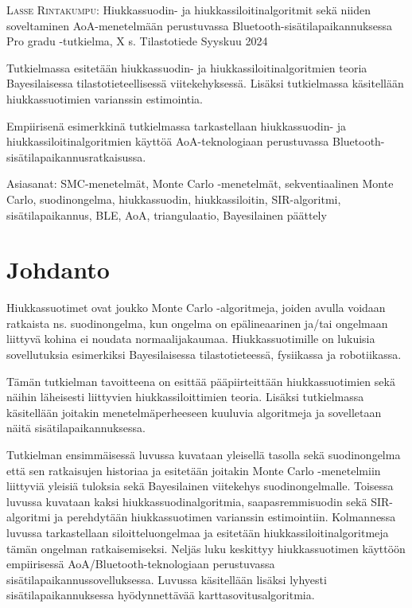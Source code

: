 \documentclass[
  12pt,
  a4paper, twoside]{book}
\newcommand{\tekija}{{Lasse Rintakumpu}}
\newcommand{\otsikko}{{Hiukkassuodin- ja hiukkassiloitinalgoritmit sekä niiden soveltaminen AoA-menetelmään perustuvassa Bluetooth-sisätilapaikannuksessa}}
\newcommand{\tutkielma}{{Pro gradu }}
\newcommand{\aika}{{Syyskuu 2024}}
\newcommand{\paaaine}{{Tilastotiede}}
\begin{document}
\noindent \textsc{\tekija}: \otsikko \newline
\tutkielma-tutkielma, X s. \newline
\paaaine \newline
\aika
\par\noindent{\rule{\textwidth}{.2mm}} \newline


\vspace{4mm}\noindent Tutkielmassa esitetään hiukkassuodin- ja hiukkassiloitinalgoritmien teoria Bayesilaisessa tilastotieteellisessä viitekehyksessä. Lisäksi tutkielmassa käsitellään hiukkassuotimien varianssin estimointia.

\vspace{4mm}\noindent Empiirisenä esimerkkinä tutkielmassa tarkastellaan hiukkassuodin- ja hiukkassiloitinalgoritmien käyttöä AoA-teknologiaan perustuvassa Bluetooth-sisätilapaikannusratkaisussa.

\vspace{4mm}\noindent Asiasanat: SMC-menetelmät, Monte Carlo -menetelmät, sekventiaalinen Monte Carlo, suodinongelma, hiukkassuodin, hiukkassiloitin, SIR-algoritmi, sisätilapaikannus, BLE, AoA, triangulaatio, Bayesilainen päättely

\cleardoublepage

\cleardoublepage

\pagestyle{plain} 

{
\hypersetup{linkcolor=blue}
\setcounter{tocdepth}{2}
\tableofcontents
}
\setlength\parindent{24pt}
\setlength\parskip{3pt}

\chapter{Johdanto}

Hiukkassuotimet ovat joukko Monte Carlo -algoritmeja, joiden avulla voidaan ratkaista ns. suodinongelma, kun ongelma on epälineaarinen ja/tai ongelmaan liittyvä kohina ei noudata normaalijakaumaa. Hiukkassuotimille on lukuisia sovellutuksia esimerkiksi Bayesilaisessa tilastotieteessä, fysiikassa ja robotiikassa.

Tämän tutkielman tavoitteena on esittää pääpiirteittään hiukkassuotimien sekä näihin läheisesti liittyvien hiukkassiloittimien teoria. Lisäksi tutkielmassa käsitellään joitakin menetelmäperheeseen kuuluvia algoritmeja ja sovelletaan näitä sisätilapaikannuksessa.

Tutkielman ensimmäisessä luvussa kuvataan yleisellä tasolla sekä suodinongelma että sen ratkaisujen historiaa ja esitetään joitakin Monte Carlo -menetelmiin liittyviä yleisiä tuloksia sekä Bayesilainen viitekehys suodinongelmalle. Toisessa luvussa kuvataan kaksi hiukkassuodinalgoritmia, saapasremmisuodin sekä SIR-algoritmi ja perehdytään hiukkassuotimen varianssin estimointiin. Kolmannessa luvussa tarkastellaan siloitteluongelmaa ja esitetään hiukkassiloitinalgoritmeja tämän ongelman ratkaisemiseksi. Neljäs luku keskittyy hiukkassuotimen käyttöön empiirisessä AoA/Bluetooth-teknologiaan perustuvassa sisätilapaikannussovelluksessa. Luvussa käsitellään lisäksi lyhyesti sisätilapaikannuksessa hyödynnettävää karttasovitusalgoritmia.
\end{document}
